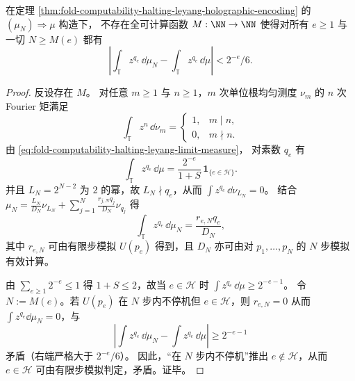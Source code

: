 \begin{theorem}\label{thm:fold-computability-halting-no-computable-modulus-sparse-moments}
在定理 \ref{thm:fold-computability-halting-leyang-holographic-encoding} 的 \((\mu_N)\Rightarrow\mu\) 构造下，
不存在全可计算函数 \(M:\NN\to\NN\) 使得对所有 \(e\ge 1\) 与一切 \(N\ge M(e)\) 都有
\[
\left|\int_{\mathbb T} z^{q_e}\,\dd\mu_N-\int_{\mathbb T} z^{q_e}\,\dd\mu\right|<2^{-e}/6.
\]
\end{theorem}
\begin{proof}
反设存在 \(M\)。
对任意 \(m\ge 1\) 与 \(n\ge 1\)，\(m\) 次单位根均匀测度 \(\nu_m\) 的 \(n\) 次 Fourier 矩满足
\[
\int_{\mathbb T}z^n\,\dd\nu_m=
\begin{cases}
1,& m\mid n,\\
0,& m\nmid n.
\end{cases}
\]
由 \eqref{eq:fold-computability-halting-leyang-limit-measure}，
对素数 \(q_e\) 有
\[
\int_{\mathbb T} z^{q_e}\,\dd\mu=
\frac{2^{-e}}{1+S}\,\mathbf 1_{\{e\in\mathcal H\}}.
\]
并且 \(L_N=2^{N-2}\) 为 \(2\) 的幂，故 \(L_N\nmid q_e\)，从而
\(
\int z^{q_e}\,\dd\nu_{L_N}=0
\)。
结合 \(\mu_N=\frac{L_N}{D_N}\nu_{L_N}+\sum_{j=1}^{N}\frac{r_{j,N}q_j}{D_N}\nu_{q_j}\) 得
\[
\int_{\mathbb T} z^{q_e}\,\dd\mu_N=\frac{r_{e,N}q_e}{D_N},
\]
其中 \(r_{e,N}\) 可由有限步模拟 \(U(p_e)\) 得到，且 \(D_N\) 亦可由对 \(p_1,\dots,p_N\) 的 \(N\) 步模拟有效计算。
\par
由 \(\sum_{e\ge 1}2^{-e}\le 1\) 得 \(1+S\le 2\)，故当 \(e\in\mathcal H\) 时
\(
\int z^{q_e}\,\dd\mu\ge 2^{-e-1}
\)。
令 \(N:=M(e)\)。若 \(U(p_e)\) 在 \(N\) 步内不停机但 \(e\in\mathcal H\)，则 \(r_{e,N}=0\) 从而 \(\int z^{q_e}\dd\mu_N=0\)，与
\[
\left|\int z^{q_e}\,\dd\mu_N-\int z^{q_e}\,\dd\mu\right|
\ge 2^{-e-1}
\]
矛盾（右端严格大于 \(2^{-e}/6\)）。
因此，“在 \(N\) 步内不停机”推出 \(e\notin\mathcal H\)，从而 \(e\in\mathcal H\) 可由有限步模拟判定，矛盾。证毕。
\end{proof}


